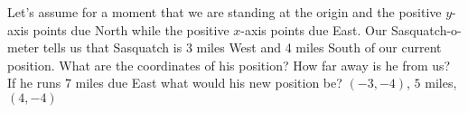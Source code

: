 {Let's assume for a moment that we are standing at the origin and the positive $y$-axis points due North while the positive $x$-axis points due East.  Our Sasquatch-o-meter tells us that Sasquatch is 3 miles West and 4 miles South of our current position.  What are the coordinates of his position?  How far away is he from us?  If he runs 7 miles due East what would his new position be?}
{$(-3, -4)$, $5$ miles, $(4, -4)$}